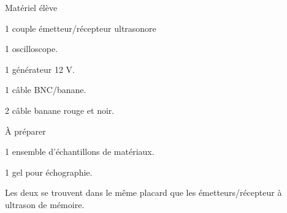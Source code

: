 
\begin{boiteMateriel}{Matériel élève}
  \effectifTerminaleStss

  \begin{listePoints}[2]
    \item 1 couple émetteur/récepteur ultrasonore
    \item 1 oscilloscope.
    \item 1 générateur 12 V.
    \item 1 câble BNC/banane.
    \item 2 câble banane rouge et noir.
  \end{listePoints}
\end{boiteMateriel}

\begin{boiteMateriel}{À préparer}
  \begin{listePoints}
    \item 1 ensemble d'échantillons de matériaux.
    \item 1 gel pour échographie.
  \end{listePoints}
  Les deux se trouvent dans le même placard que les émetteurs/récepteur à ultrason de mémoire.
\end{boiteMateriel}